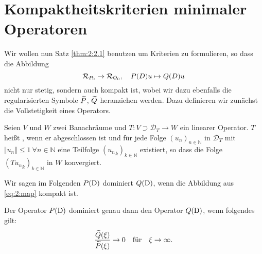 \section{Kompaktheitskriterien minimaler Operatoren}
Wir wollen nun Satz \ref{thm:2:2.1} benutzen um Kriterien zu formulieren, so dass die Abbildung
\begin{equation}\label{eq:2:map}
\mathcal R_{P_0}\to\mathcal R_{Q_0},\quad P(D)u\mapsto Q(D)u
\end{equation}
nicht nur stetig, sondern auch kompakt ist, wobei wir dazu ebenfalls die regularisierten Symbole $\widetilde{P}$, $\widetilde{Q}$ heranziehen werden. Dazu definieren wir zunächst die Vollstetigkeit eines Operators.
\begin{df}
Seien $V$ und $W$ zwei Banachräume und $T: V \supset \mathcal{D}_T \rightarrow W$ ein linearer Operator. $T$ heißt , wenn er abgeschlossen ist und für jede Folge $(u_n)_{n \in \mathbb{N}}$ in $\mathcal{D}_T$ mit $\Vert u_n \Vert \leq 1 \ \forall n \in \mathbb{N}$ eine Teilfolge $({u_n}_k)_{k \in \mathbb{N}}$ existiert, so dass die Folge $({Tu_n}_k)_{k\in \mathbb{N}}$ in $W$ konvergiert.
\end{df}
Wir sagen im Folgenden $P(\mathrm D)$ dominiert $Q(\mathrm D)$, wenn die Abbildung aus \eqref{eq:2:map} kompakt ist.
\begin{thm}\label{Abbildung kompakt}
Der Operator $P(\mathrm D)$ dominiert genau dann den Operator $Q(\mathrm D)$,
wenn folgendes gilt:
\begin{equation}\label{eq:2:tozero}
\frac{\widetilde{Q}(\xi)}{\widetilde{P}(\xi)}\rightarrow0 \quad\text{für}\quad\xi\rightarrow\infty.
\end{equation}
\end{thm}
